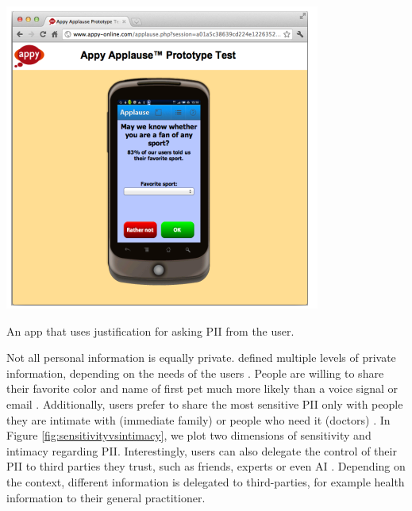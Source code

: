 \documentclass[sigchi-a,nonacm]{acmart}
\begin{document}
\begin{marginfigure}
    \centering
    \includegraphics[width=\linewidth]{appy}
    \caption{An app that uses justification for asking PII from the user. \cite{knijnenburg2013HelpingUsersInformation}}
    \label{fig:appy}
\end{marginfigure}

Not all personal information is equally private.
\citeauthor{kim2018HowMultilevelPrivacy} defined multiple levels of private information, depending on the needs of the users \cite{kim2018HowMultilevelPrivacy}. People are willing to share their favorite color and name of first pet much more likely than a voice signal or email
\cite{marmion2019WillingnessCrowdsCohort}. Additionally, users prefer to share the most sensitive PII only with people they are intimate with (immediate family) or people who need it (doctors) \cite{rapp2016PersonalInformaticsEveryday}. In Figure \ref{fig:sensitivityvsintimacy}, we plot two dimensions of sensitivity and intimacy regarding PII. Interestingly, users can also delegate the control of their PII to third parties they trust, such as friends, experts or even AI \cite{nissen2019ShouldAgreeDelegating}. Depending on the context, different information is delegated to third-parties, for example health information to their general practitioner.
\end{document}
